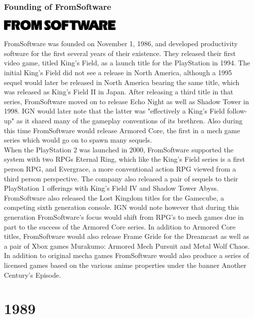 \documentclass[11pt]{report}
\begin{document}
\subsection{Founding of FromSoftware}
\vspace{2mm}\begin{center}\includegraphics[width=6cm]{./img/fromSoftwareLogo.jpg}\end{center}
FromSoftware was founded on November 1, 1986, and developed productivity software for the first several years of their existence. They released their first video game, titled King's Field, as a launch title for the PlayStation in 1994. The initial King's Field did not see a release in North America, although a 1995 sequel would later be released in North America bearing the same title, which was released as King's Field II in Japan. After releasing a third title in that series, FromSoftware moved on to release Echo Night as well as Shadow Tower in 1998. IGN would later note that the latter was "effectively a King's Field follow-up" as it shared many of the gameplay conventions of its brethren. Also during this time FromSoftware would release Armored Core, the first in a mech game series which would go on to spawn many sequels.\\
\indent When the PlayStation 2 was launched in 2000, FromSoftware supported the system with two RPGs Eternal Ring, which like the King's Field series is a first person RPG, and Evergrace, a more conventional action RPG viewed from a third person perspective. The company also released a pair of sequels to their PlayStation 1 offerings with King's Field IV and Shadow Tower Abyss. FromSoftware also released the Lost Kingdom titles for the Gamecube, a competing sixth generation console. IGN would note however that during this generation FromSoftware's focus would shift from RPG's to mech games due in part to the success of the Armored Core series. In addition to Armored Core titles, FromSoftware would also release Frame Gride for the Dreamcast as well as a pair of Xbox games Murakumo: Armored Mech Pursuit and Metal Wolf Chaos. In addition to original mecha games FromSoftware would also produce a series of licensed games based on the various anime properties under the banner Another Century's Episode.

\chapter{1989}
\end{document}
